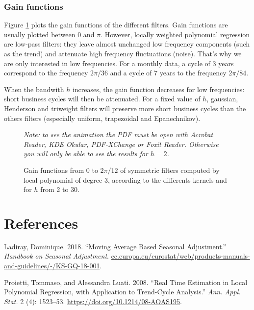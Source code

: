 \documentclass[
  12pt,
  ,
  a4paper]{article}
\newcommand\1{\mathds{1}}
\begin{document}
\hypertarget{gain-functions}{%
\subsubsection{Gain functions}\label{gain-functions}}

Figure \ref{fig:filtersSymgains} plots the gain functions of the different filters.
Gain functions are usually plotted between 0 and \(\pi\).
However, locally weighted polynomial regression are low-pass filters: they leave almost unchanged low frequency components (such as the trend) and attenuate high frequency fluctuations (noise).
That's why we are only interested in low frequencies.
For a monthly data, a cycle of 3 years correspond to the frequency \(2\pi/36\) and a cycle of 7 years to the frequency \(2\pi/84\).

When the bandwith \(h\) increases, the gain function decreases for low frequencies: short business cycles will then be attenuated.
For a fixed value of \(h\), gaussian, Henderson and triweight filters will preserve more short business cycles than the others filters (especially uniform, trapezoidal and Epanechnikov).

\begin{figure}[H]
\caption{Gain functions from 0 to $2\pi/12$ of symmetric filters computed by local polynomial of degree $3$, according to the differents kernels and for $h$ from 2 to 30.}\label{fig:filtersSymgains}\footnotesize
\emph{Note: to see the animation the PDF must be open with Acrobat Reader, KDE Okular, PDF-XChange or Foxit Reader.
Otherwise you will only be able to see the results for $h=2$.}
\end{figure}

\newpage

\hypertarget{references}{%
\section*{References}\label{references}}

\hypertarget{refs}{}
\leavevmode\hypertarget{ref-ch12HBSA}{}%
Ladiray, Dominique. 2018. ``Moving Average Based Seasonal Adjustment.'' \emph{Handbook on Seasonal Adjustment}. \url{ec.europa.eu/eurostat/web/products-manuals-and-guidelines/-/KS-GQ-18-001}.

\leavevmode\hypertarget{ref-proietti2008}{}%
Proietti, Tommaso, and Alessandra Luati. 2008. ``Real Time Estimation in Local Polynomial Regression, with Application to Trend-Cycle Analysis.'' \emph{Ann. Appl. Stat.} 2 (4): 1523--53. \url{https://doi.org/10.1214/08-AOAS195}.
\end{document}
